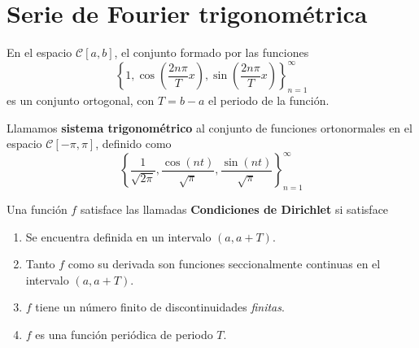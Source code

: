 \section{Serie de Fourier trigonométrica}


\begin{propo}
    En el espacio $\mathscr{C}[a,b]$, el conjunto formado por las funciones
    $$\left\{ 1, \cos\left( \frac{2n \pi}{T}x \right), \sin\left( \frac{2n \pi}{T}x \right) \right\}_{n=1}^{\infty}$$
    es un conjunto ortogonal, con $T = b-a$ el periodo de la función.
\end{propo}


\begin{defi} 
    Llamamos \textbf{sistema trigonométrico} al conjunto de funciones ortonormales en el espacio $\mathscr{C}[-\pi,\pi]$, definido como
    $$\left\{ \frac{1}{\sqrt{2\pi}}, \frac{\cos(nt)}{\sqrt{\pi}}, \frac{\sin(nt)}{\sqrt{\pi}} \right\}_{n=1}^{\infty}$$
\end{defi}

\begin{defi} 
    Una función $f$ satisface las llamadas \textbf{Condiciones de Dirichlet} si satisface
    \begin{enumerate}
        \item Se encuentra definida en un intervalo $(a,a+T)$.
        \item Tanto $f$ como su derivada son funciones seccionalmente continuas en el intervalo $(a,a+T)$.
        \item $f$ tiene un número finito de discontinuidades \emph{finitas}.
        \item $f$ es una función periódica de periodo $T$.
    \end{enumerate}

\end{defi}

